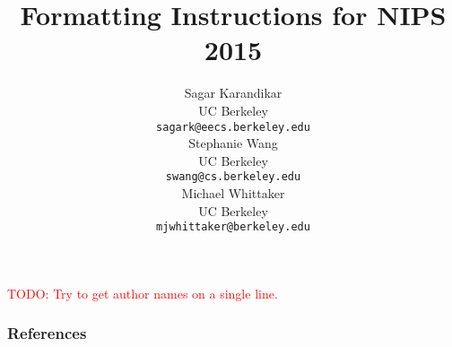 \documentclass{article}
\title{Formatting Instructions for NIPS 2015}
\author{%
  Sagar Karandikar \\
  UC Berkeley\\
  \texttt{sagark@eecs.berkeley.edu} \\
  \And{}
  Stephanie Wang \\
  UC Berkeley\\
  \texttt{swang@cs.berkeley.edu} \\
  \And{}
  Michael Whittaker \\
  UC Berkeley \\
  \texttt{mjwhittaker@berkeley.edu} \\
}
\newcommand{\todo}[1]{\textcolor{red}{\Large TODO: #1}}
\begin{document}
\maketitle
\todo{Try to get author names on a single line.}

{}
{}
{}
{}
{}
{}
{}

\subsubsection*{References}


\end{document}
